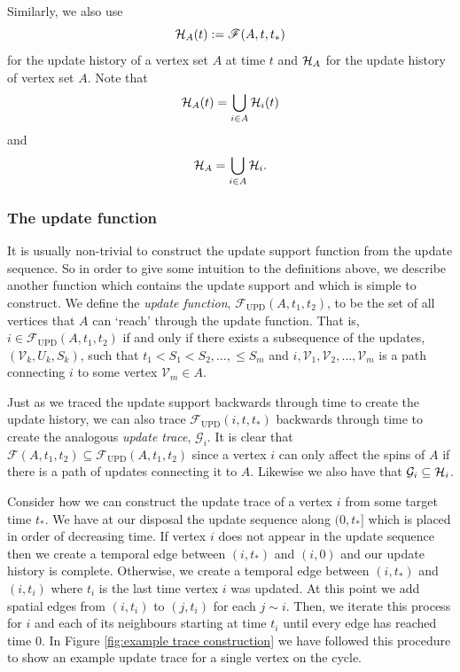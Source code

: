 	Similarly, we also use 
	\begin{equation}
		\mathcal{H}_A(t) := \mathscr{F}(A, t, t_*)
	\end{equation}
	for the update history of a vertex set $A$ at time $t$ and $\mathcal{H}_A$ for the update history of vertex set $A$. Note that
	\begin{equation}
		\mathcal{H}_A(t) = \bigcup_{i \in A} \mathcal{H}_i(t)
	\end{equation}
	and 
	\begin{equation}
		\mathcal{H}_A = \bigcup_{i \in A} \mathcal{H}_i.
	\end{equation}

	
	\subsubsection{The update function}
	\label{sec: definition update function}
	It is usually non-trivial to construct the update support function from the update sequence. So in order to give some intuition to the definitions above, we describe another function which contains the update support and which is simple to construct. We define the \emph{update function}, $\mathscr{F}_\mathrm{UPD}(A, t_1, t_2)$, to be the set of all vertices that $A$ can `reach' through the update function. That is, $i \in \mathscr{F}_\mathrm{UPD}(A, t_1, t_2)$ if and only if there exists a subsequence of the updates, $(\mathcal{V}_k, U_k, S_k)$, such that $t_1 < S_1 < S_2, \dots, \leq S_m$ and $i, \mathcal{V}_1, \mathcal{V}_2, \dots, \mathcal{V}_m$ is a path connecting $i$ to some vertex $\mathcal{V}_m \in A$. 

	Just as we traced the update support backwards through time to create the update history, we can also trace $\mathscr{F}_\mathrm{UPD}(i, t, t_*)$ backwards through time to create the analogous \emph{update trace}, $\mathcal{G}_i$. It is clear that $\mathscr{F}(A, t_1, t_2) \subseteq \mathscr{F}_\mathrm{UPD}(A, t_1, t_2)$ since a vertex $i$ can only affect the spins of $A$ if there is a path of updates connecting it to $A$. Likewise we also have that $\mathcal{G}_i \subseteq \mathcal{H}_i$.
	
	Consider how we can construct the update trace of a vertex $i$ from some target time $t_*$. We have at our disposal the update sequence along $(0, t_*]$ which is placed in order of decreasing time. If vertex $i$ does not appear in the update sequence then we create a temporal edge between $(i, t_*)$ and $(i, 0)$ and our update history is complete. Otherwise, we create a temporal edge between $(i, t_*)$ and $(i, t_i)$ where $t_i$ is the last time vertex $i$ was updated. At this point we add spatial edges from $(i, t_i)$ to $(j, t_i)$ for each $j\sim i$. Then, we iterate this process for $i$ and each of its neighbours starting at time $t_i$ until every edge has reached time $0$. In Figure \ref{fig:example trace construction} we have followed this procedure to show an example update trace for a single vertex on the cycle. 

